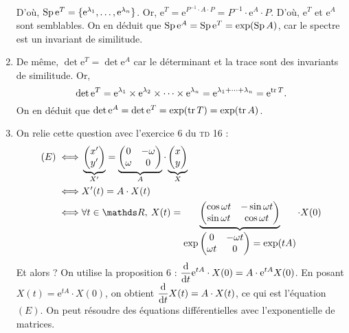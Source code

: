 \begin{exmn}[Cadeaux]
\begin{enumerate}[label=(\textit{\alph*})]
\begin{align*}
			\end{align*}
			D'où, $\operatorname{Sp} \mathrm{e}^T = \{\mathrm{e}^{\lambda_1}, \ldots, \mathrm{e}^{\lambda_n}\}$.
			Or, $\mathrm{e}^{T} = \mathrm{e}^{P^{-1}\cdot A\cdot P} = P^{-1} \cdot  \mathrm{e}^{A} \cdot  P$.
			D'où, $\mathrm{e}^{T}$ et $\mathrm{e}^{A}$ sont semblables.
			On en déduit que $\operatorname{Sp} \mathrm{e}^{A} = \operatorname{Sp} \mathrm{e}^{T} = \exp(\operatorname{Sp} A)$, car le spectre est un invariant de similitude.
		\item De même, $\det \mathrm{e}^T = \det \mathrm{e}^A$ car le déterminant et la trace sont des invariants de similitude. Or, \[
				\operatorname{det} \mathrm{e}^T = \mathrm{e}^{\lambda_1} \times \mathrm{e}^{\lambda_2} \times \cdots \times \mathrm{e}^{\lambda_n} = \mathrm{e}^{\lambda_1 + \cdots + \lambda_n} = \mathrm{e}^{\operatorname{tr} T}
			.\]
			On en déduit que $\operatorname{det} \mathrm{e}^A = \operatorname{det} \mathrm{e}^{T} = \exp(\operatorname{tr} T) = \exp(\operatorname{tr} A)$.
		\item On relie cette question avec l'exercice 6 du \textsc{td} 16 :
			\begin{align*}
				(E) \iff& \underbrace{\begin{pmatrix}
					x'\\ y'
				\end{pmatrix}}_{X'} = \underbrace{\begin{pmatrix}
					0 & -\omega\\
					\omega & 0
				\end{pmatrix}}_A \cdot\underbrace{ \begin{pmatrix}
					x \\ y
				\end{pmatrix}}_X\\
				\iff& X'(t) = A\cdot X(t) \\
				\iff& \forall t \in \R,\: X(t) = \ds\underbrace{\begin{pmatrix}
					\cos \omega t & -\sin \omega t\\
					\sin \omega t & \cos \omega t
				\end{pmatrix}}_{\ts\exp \begin{pmatrix}
					0 & -\omega t\\
					\omega t & 0
				\end{pmatrix} = \exp(tA)} \cdot X(0) \\
			\end{align*}
			Et alors ? On utilise la proposition 6 : $\displaystyle \frac{\mathrm{d}}{\mathrm{d}t} \mathrm{e}^{tA} \cdot X(0) = A \cdot \mathrm{e}^{tA} X(0)$. En posant $X(t) = \mathrm{e}^{tA} \cdot X(0)$, on obtient $\displaystyle\frac{\mathrm{d}}{\mathrm{d}t} X(t) = A \cdot X(t)$, ce qui est l'équation $(E)$. On peut résoudre des équations différentielles avec l'exponentielle de matrices.
	\end{enumerate}
\end{exmn}

